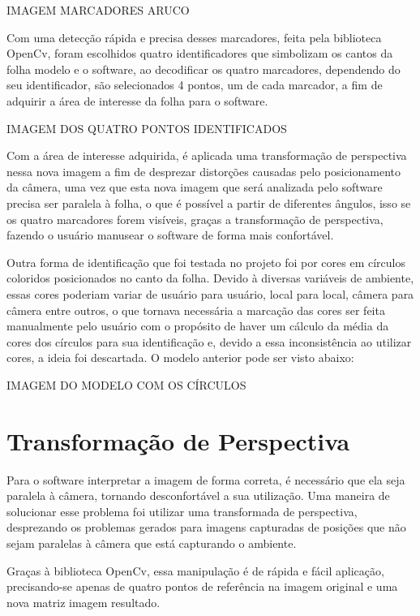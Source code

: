 \documentclass[12pt]{report}
\begin{document}
IMAGEM MARCADORES ARUCO

Com uma detecção rápida e precisa desses marcadores, feita pela biblioteca OpenCv, foram escolhidos quatro identificadores que simbolizam os cantos da folha modelo e o software, ao decodificar os quatro marcadores, dependendo do seu identificador, são selecionados 4 pontos, um de cada marcador, a fim de adquirir a área de interesse da folha para o software.

IMAGEM DOS QUATRO PONTOS IDENTIFICADOS

Com a área de interesse adquirida, é aplicada uma transformação de perspectiva nessa nova imagem a fim de  desprezar distorções causadas pelo posicionamento da câmera, uma vez que esta nova imagem que será analizada pelo software precisa ser paralela à folha, o que é possível a partir de diferentes ângulos, isso se os quatro marcadores forem visíveis, graças a transformação de perspectiva, fazendo o usuário manusear o software de forma mais confortável.

Outra forma de identificação que foi testada no projeto foi por cores em círculos coloridos posicionados no canto da folha. Devido à diversas variáveis de ambiente, essas cores poderiam variar de usuário para usuário, local para local, câmera para câmera entre outros, o que tornava necessária a marcação das cores ser feita manualmente pelo usuário com o propósito de haver um cálculo da média da cores dos círculos para sua identificação e, devido a essa inconsistência ao utilizar cores, a ideia foi descartada. O modelo anterior pode ser visto abaixo:

IMAGEM DO MODELO COM OS CÍRCULOS


\chapter{Transformação de Perspectiva}
\label{cha:fund-teor}

Para o software interpretar a imagem de forma correta, é necessário que ela seja paralela à câmera, tornando desconfortável a sua utilização. Uma maneira de solucionar esse problema foi utilizar uma transformada de perspectiva, desprezando os problemas gerados para imagens capturadas de posições que não sejam paralelas à câmera que está capturando o ambiente.

Graças à biblioteca OpenCv, essa manipulação é de rápida e fácil aplicação, precisando-se apenas de quatro pontos de referência na imagem original e uma nova matriz imagem resultado.
\end{document}
